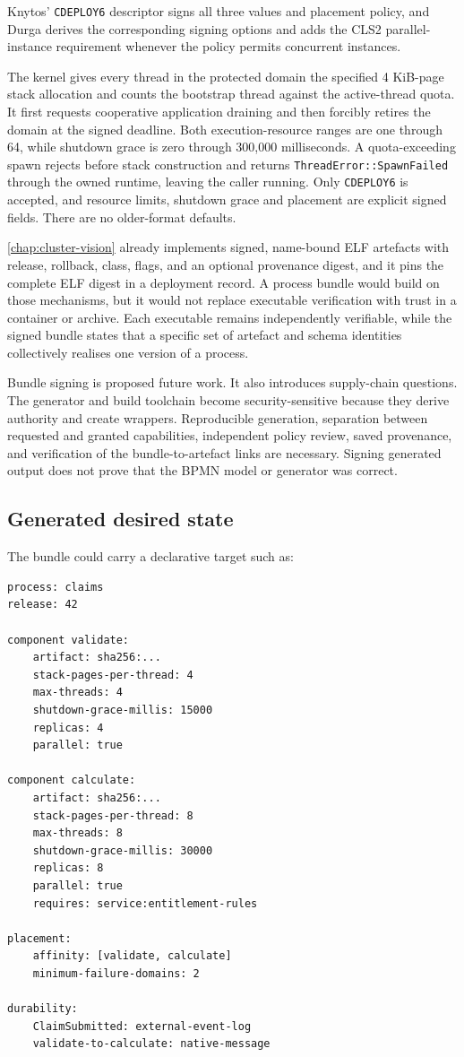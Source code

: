 Knytos' \texttt{CDEPLOY6} descriptor signs all three values and placement policy,
and Durga derives the corresponding signing options and adds the CLS2 parallel-instance
requirement whenever the policy permits concurrent instances.

The kernel gives every thread
in the protected domain the specified 4 KiB-page stack allocation and counts
the bootstrap thread against the active-thread quota. It first requests
cooperative application draining and then forcibly retires the domain at the
signed deadline. Both execution-resource ranges are one through 64, while shutdown
grace is zero through 300,000 milliseconds. A quota-exceeding spawn rejects
before stack construction and returns \texttt{ThreadError::SpawnFailed} through
the owned runtime, leaving the caller running. Only \texttt{CDEPLOY6} is accepted, and
resource limits, shutdown grace and placement are explicit signed fields.
There are no older-format defaults.

\autoref{chap:cluster-vision} already implements signed, name-bound ELF artefacts
with release, rollback, class, flags, and an optional provenance digest, and it pins
the complete ELF digest in a deployment record. A process bundle would build on
those mechanisms, but it would not replace executable verification with trust in a
container or archive. Each executable remains independently verifiable, while
the signed bundle states that a specific set of artefact and schema identities
collectively realises one version of a process.

Bundle signing is proposed future work. It also introduces supply-chain
questions. The generator and build toolchain become security-sensitive because
they derive authority and create wrappers. Reproducible generation, separation
between requested and granted capabilities, independent policy review, saved
provenance, and verification of the bundle-to-artefact links are necessary.
Signing generated output does not prove that the BPMN model or generator was
correct.

\subsection{Generated desired state}

The bundle could carry a declarative target such as:

\begin{verbatim}
process: claims
release: 42

component validate:
    artifact: sha256:...
    stack-pages-per-thread: 4
    max-threads: 4
    shutdown-grace-millis: 15000
    replicas: 4
    parallel: true

component calculate:
    artifact: sha256:...
    stack-pages-per-thread: 8
    max-threads: 8
    shutdown-grace-millis: 30000
    replicas: 8
    parallel: true
    requires: service:entitlement-rules

placement:
    affinity: [validate, calculate]
    minimum-failure-domains: 2

durability:
    ClaimSubmitted: external-event-log
    validate-to-calculate: native-message
\end{verbatim}

